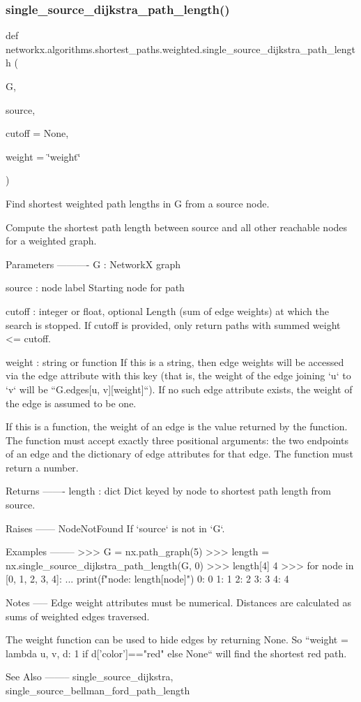 \subsubsection{\texorpdfstring{single\+\_\+source\+\_\+dijkstra\+\_\+path\+\_\+length()}{single\_source\_dijkstra\_path\_length()}}
{\footnotesize\ttfamily def networkx.\+algorithms.\+shortest\+\_\+paths.\+weighted.\+single\+\_\+source\+\_\+dijkstra\+\_\+path\+\_\+length (\begin{DoxyParamCaption}\item[{}]{G,  }\item[{}]{source,  }\item[{}]{cutoff = {\ttfamily None},  }\item[{}]{weight = {\ttfamily \char`\"{}weight\char`\"{}} }\end{DoxyParamCaption})}

\begin{DoxyVerb}Find shortest weighted path lengths in G from a source node.

Compute the shortest path length between source and all other
reachable nodes for a weighted graph.

Parameters
----------
G : NetworkX graph

source : node label
    Starting node for path

cutoff : integer or float, optional
    Length (sum of edge weights) at which the search is stopped.
    If cutoff is provided, only return paths with summed weight <= cutoff.

weight : string or function
    If this is a string, then edge weights will be accessed via the
    edge attribute with this key (that is, the weight of the edge
    joining `u` to `v` will be ``G.edges[u, v][weight]``). If no
    such edge attribute exists, the weight of the edge is assumed to
    be one.

    If this is a function, the weight of an edge is the value
    returned by the function. The function must accept exactly three
    positional arguments: the two endpoints of an edge and the
    dictionary of edge attributes for that edge. The function must
    return a number.

Returns
-------
length : dict
    Dict keyed by node to shortest path length from source.

Raises
------
NodeNotFound
    If `source` is not in `G`.

Examples
--------
>>> G = nx.path_graph(5)
>>> length = nx.single_source_dijkstra_path_length(G, 0)
>>> length[4]
4
>>> for node in [0, 1, 2, 3, 4]:
...     print(f"{node}: {length[node]}")
0: 0
1: 1
2: 2
3: 3
4: 4

Notes
-----
Edge weight attributes must be numerical.
Distances are calculated as sums of weighted edges traversed.

The weight function can be used to hide edges by returning None.
So ``weight = lambda u, v, d: 1 if d['color']=="red" else None``
will find the shortest red path.

See Also
--------
single_source_dijkstra, single_source_bellman_ford_path_length\end{DoxyVerb}
 
